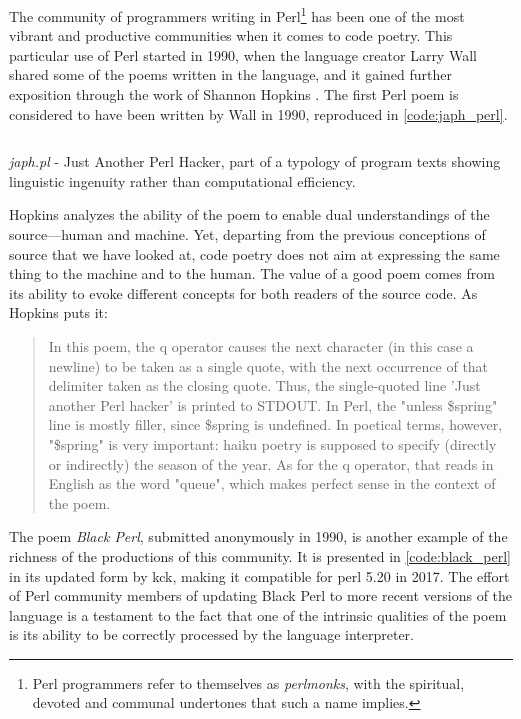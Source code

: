 The community of programmers writing in Perl\footnote{Perl programmers refer to themselves as \emph{perlmonks}, with the spiritual, devoted and communal undertones that such a name implies.} has been one of the most vibrant and productive communities when it comes to code poetry. This particular use of Perl started in 1990, when the language creator Larry Wall shared some of the poems written in the language, and it gained further exposition through the work of Shannon Hopkins \citep{hopkins_camels_1992}. The first Perl poem is considered to have been written by Wall in 1990, reproduced in \autoref{code:japh_perl}.

\begin{listing}
  \inputminted{perl}{./corpus/japh.pl}
  \caption{\emph{japh.pl} - Just Another Perl Hacker, part of a typology of program texts showing linguistic ingenuity rather than computational efficiency.}
  \label{code:japh_perl}
\end{listing}

Hopkins analyzes the ability of the poem to enable dual understandings of the source—human and machine. Yet, departing from the previous conceptions of source that we have looked at, code poetry does not aim at expressing the same thing to the machine and to the human. The value of a good poem comes from its ability to evoke different concepts for both readers of the source code. As Hopkins puts it:

\begin{quote}
  In this poem, the q operator causes the next character (in this case a newline) to be taken as a single quote, with the next occurrence of that delimiter taken as the closing quote. Thus, the single-quoted line 'Just another Perl hacker' is printed to STDOUT. In Perl, the "unless \$spring" line is mostly filler, since \$spring is undefined. In poetical terms, however, "\$spring" is very important: haiku poetry is supposed to specify (directly or indirectly) the season of the year. As for the q operator, that reads in English as the word "queue", which makes perfect sense in the context of the poem. \citep{hopkins_camels_1992}
\end{quote}

The poem \emph{Black Perl}, submitted anonymously in 1990, is another example of the richness of the productions of this community. It is presented in \autoref{code:black_perl} in its updated form by kck, making it compatible for perl 5.20 in 2017. The effort of Perl community members of updating Black Perl to more recent versions of the language is a testament to the fact that one of the intrinsic qualities of the poem is its ability to be correctly processed by the language interpreter.

